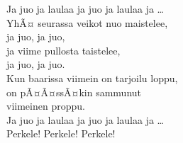 \documentclass[a4paper,12pt,oneside]{lauluvihko}
\begin{document}
\begin{multicols}{2}
Ja juo ja laulaa ja juo ja laulaa ja \ldots\\ 

YhÃ¤ seurassa veikot nuo maistelee,\\ 
ja juo, ja juo,\\ 
ja viime pullosta taistelee,\\ 
ja juo, ja juo.\\ 
Kun baarissa viimein on tarjoilu loppu,\\ 
on pÃ¤Ã¤ssÃ¤kin sammunut \\ 
viimeinen proppu.\\ 

Ja juo ja laulaa ja juo ja laulaa ja \ldots\\ 

Perkele! Perkele! Perkele!

\end{multicols}

\newpage
\takakansi
\end{document}
